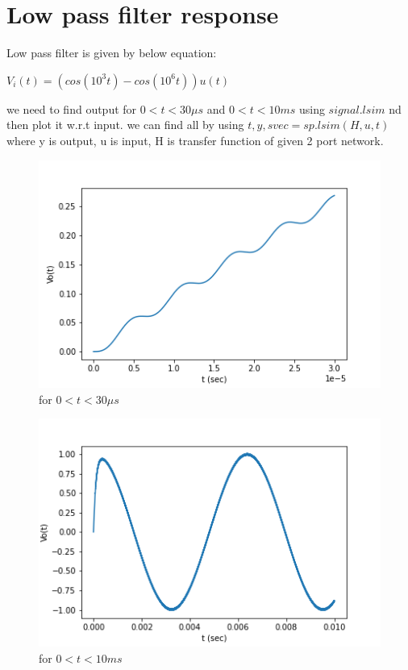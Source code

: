 \documentclass[11pt, a4paper]{article}
\begin{document}
\section{Low pass filter response}
Low pass filter is given by below equation:\newline
\begin{center}
$V_i(t) = (cos(10^3t) - cos(10^6t))u(t)$
\end{center}
we need to find output for $0<t<30\mu s$ and $0<t<10ms$ using $signal.lsim$ nd then plot it w.r.t input.
we can find all by using $t,y,svec=sp.lsim(H,u,t)$ where y is output, u is input, H is transfer function of given 2 port network.
    \begin{figure}[!tbh]
      \centering
      \includegraphics[scale=0.5]{Vo_t1.png}  
      \caption{for $0<t<30\mu s$} 
      \label{fig:fig5}
    \end{figure}
    \begin{figure}[!tbh]
      \centering
      \includegraphics[scale=0.5]{Vo_t2.png}  
      \caption{for $0<t<10ms$} 
      \label{fig:fig6}
    \end{figure}
\end{document}
